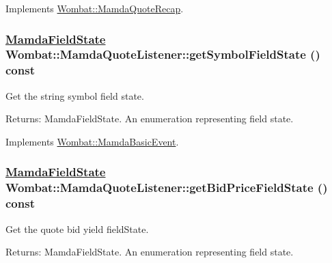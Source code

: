 Implements \hyperlink{classWombat_1_1MamdaQuoteRecap_b9d92f8b80dfe1efbb6452ce38c192b8}{Wombat::Mamda\-Quote\-Recap}.\hypertarget{classWombat_1_1MamdaQuoteListener_e5281f487264bda71fde9182921d6ae5}{
\subsubsection[getSymbolFieldState]{\setlength{\rightskip}{0pt plus 5cm}\hyperlink{namespaceWombat_93aac974f2ab713554fd12a1fa3b7d2a}{Mamda\-Field\-State} Wombat::Mamda\-Quote\-Listener::get\-Symbol\-Field\-State () const}}
\label{classWombat_1_1MamdaQuoteListener_e5281f487264bda71fde9182921d6ae5}


Get the string symbol field state. 

\begin{Desc}
\item[Returns:]Mamda\-Field\-State. An enumeration representing field state. \end{Desc}


Implements \hyperlink{classWombat_1_1MamdaBasicEvent_ef95e19f4babb0e5ea8549d6cf29d13f}{Wombat::Mamda\-Basic\-Event}.\hypertarget{classWombat_1_1MamdaQuoteListener_edb910c741c98a43134d0abcb325079e}{
\subsubsection[getBidPriceFieldState]{\setlength{\rightskip}{0pt plus 5cm}\hyperlink{namespaceWombat_93aac974f2ab713554fd12a1fa3b7d2a}{Mamda\-Field\-State} Wombat::Mamda\-Quote\-Listener::get\-Bid\-Price\-Field\-State () const}}
\label{classWombat_1_1MamdaQuoteListener_edb910c741c98a43134d0abcb325079e}


Get the quote bid yield field\-State. 

\begin{Desc}
\item[Returns:]Mamda\-Field\-State. An enumeration representing field state. \end{Desc}


